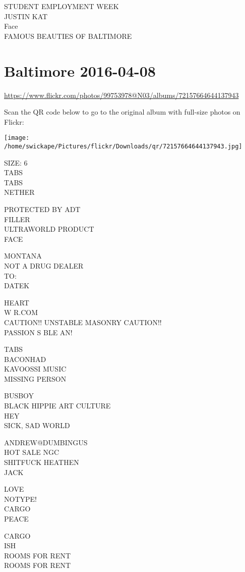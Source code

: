 \documentclass[10pt,letterpaper]{article}
\begin{document}
STUDENT EMPLOYMENT WEEK\\
JUSTIN KAT\\
Face\\
FAMOUS BEAUTIES OF BALTIMORE


\section*{Baltimore 2016-04-08}

\url{https://www.flickr.com/photos/99753978@N03/albums/72157664644137943}

Scan the QR code below to go to the original album with full-size photos on Flickr:

\texttt{[image: /home/swickape/Pictures/flickr/Downloads/qr/72157664644137943.jpg]}


SIZE: 6\\
TABS\\
TABS\\
NETHER

PROTECTED BY ADT\\
FILLER\\
ULTRAWORLD PRODUCT\\
FACE

MONTANA\\
NOT A DRUG DEALER\\
TO:\\
DATEK

HEART\\
W R.COM\\
CAUTION!! UNSTABLE MASONRY CAUTION!!\\
PASSION S BLE AN!

TABS\\
BACONHAD\\
KAVOOSSI MUSIC\\
MISSING PERSON

BUSBOY\\
BLACK HIPPIE ART CULTURE\\
HEY\\
SICK, SAD WORLD

ANDREW@DUMBINGUS\\
HOT SALE NGC\\
SHITFUCK HEATHEN\\
JACK

LOVE\\
NOTYPE!\\
CARGO\\
PEACE

CARGO\\
ISH\\
ROOMS FOR RENT\\
ROOMS FOR RENT
\end{document}
